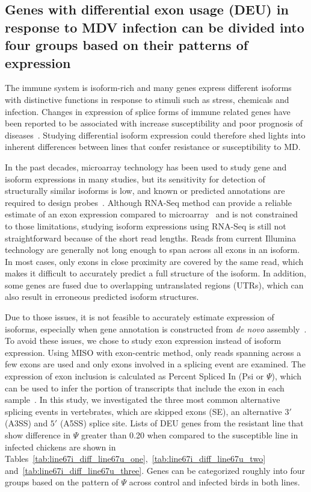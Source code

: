 \documentclass[10pt]{article}
\begin{document}
\subsection*{Genes with differential exon usage (DEU) in response
to MDV infection can be divided into four groups based on their
patterns of expression}

The immune system is isoform-rich and many genes express
different isoforms with distinctive functions in response to
stimuli such as stress, chemicals and infection.  Changes in
expression of splice forms of immune related genes have been
reported to be associated with increase susceptibility and poor
prognosis of diseases~\cite{lynch2004consequences}.  Studying
differential isoform expression could therefore shed lights into
inherent differences between lines that confer resistance or
susceptibility to MD.

In the past decades, microarray technology has been used to study
gene and isoform expressions in many studies, but its sensitivity
for detection of structurally similar isoforms is low, and known
or predicted annotations are required to design
probes~\cite{kane2000assessment}.  Although RNA-Seq method can
provide a reliable estimate of an exon expression compared to
microarray~\cite{pan2008deep} and is not constrained to those
limitations, studying isoform expressions using RNA-Seq is still
not straightforward because of the short read lengths.  Reads
from current Illumina technology are generally not long enough to
span across all exons in an isoform.  In most cases, only exons
in close proximity are covered by the same read, which makes it
difficult to accurately predict a full structure of the isoform.
In addition, some genes are fused due to overlapping untranslated
regions (UTRs), which can also result in erroneous predicted
isoform structures.

Due to those issues, it is not feasible to accurately estimate
expression of isoforms, especially when gene annotation is
constructed from {\em de novo}
assembly~\cite{trapnell2013differential}.  To avoid these issues,
we chose to study exon expression instead of isoform expression.
Using MISO with exon-centric method, only reads spanning across a
few exons are used and only exons involved in a splicing event
are examined.  The expression of exon inclusion is calculated as
Percent Spliced In (Psi or $\Psi$), which can be used to infer
the portion of transcripts that include the exon in each
sample~\cite{Katz:2010iv}.  In this study, we investigated the
three most common alternative splicing events in vertebrates,
which are skipped exons (SE), an alternative $3\prime$ (A3SS) and
$5\prime$ (A5SS) splice site.  Lists of DEU genes from the
resistant line that show difference in $\Psi$ greater than 0.20
when compared to the susceptible line in infected chickens are
shown in
Tables~\ref{tab:line67i_diff_line67u_one},~\ref{tab:line67i_diff_line67u_two}
and~\ref{tab:line67i_diff_line67u_three}.  Genes can be
categorized roughly into four groups based on the pattern of
$\Psi$ across control and infected birds in both lines.
\end{document}
